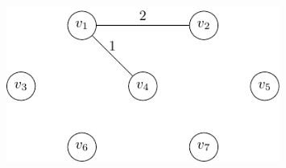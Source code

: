 \begin{minipage}{0.25\textwidth}
\begin{figure}[H]
  \centering
  \includegraphics[width=0.8\textwidth]{Figure/prim_algo_d3.pdf}
\end{figure}
\end{minipage}

